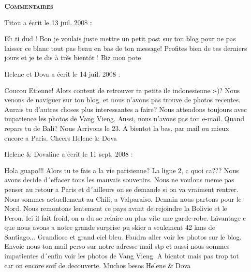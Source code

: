 \bigskip
\textbf{\textsc{Commentaires}}

\medskip
Titou a écrit le 13 juil. 2008 :
\begin{displayquote}
Eh ti dud !
Bon je voulais juste mettre un petit post sur ton blog pour ne pas laisser ce blanc tout pas beau en bas de ton message! Profites bien de tes derniers jours et je te dis à très bientôt ! 
Biz mon pote
\end{displayquote}

\medskip
Helene et Dova a écrit le 14 juil. 2008 :
\begin{displayquote}
Coucou Etienne!
Alors content de retrouver ta petite ile indonesienne :-)?
Nous venons de naviguer sur ton blog, et nous n'avons pas trouve de photos recentes. Aurais tu d'autres choses plus interessantes a faire?
Nous attendons toujours avec impatience les photos de Vang Vieng.
Aussi, nous n'avons pas ton e-mail. 
Quand repars tu de Bali? Nous Arrivons le 23. 
A bientot la bas, par mail ou mieux encore a Paris.
Cheers Helene & Dova
\end{displayquote}

\medskip
Helene & Dovaline a écrit le 11 sept. 2008 :
\begin{displayquote}
Hola guapo!!!
Alors tu te fais a la vie parisienne? La ligne 2, c quoi ca??? Nous avons decide d´effacer tous les mauvais souvenirs. Nous ne voulons meme pas penser au retour a Paris et d´ailleurs on se demande si on va vraiment rentrer.
Nous sommes actuellement au Chili, a Valparaiso. Demain nous partons pour le Nord. Nous remontons lentement ce pays avant de rejoindre la Bolivie et le Perou. Ici il fait froid, on a du se refaire au plus vite une garde-robe. Lávantage c que nous avons a notre grande surprise pu skier a seulement 42 kms de Santiago... Grandiose et grand ciel bleu. Faudra aller voir les photos sur le blog.
Envoie nous ton mail perso sur notre adresse mail stp et aussi nous sommes impatientes d´enfin voir les photos de Vang Vieng.
A bientot mais pas trop tot car on encore soif de decouverte.
Muchos besos
Helene & Dova
\end{displayquote}

